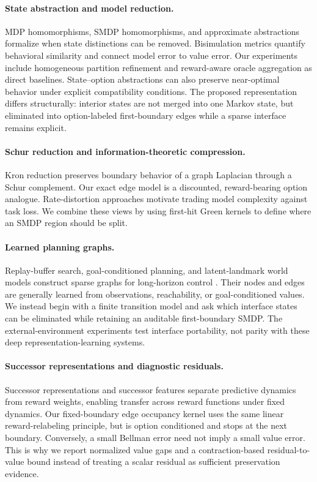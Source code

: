 \documentclass[10pt]{article}
\begin{document}
\paragraph{State abstraction and model reduction.}
MDP homomorphisms, SMDP homomorphisms, and approximate abstractions formalize
when state distinctions can be removed\citep{ravindran2003smdp,li2006abstraction}.
Bisimulation metrics quantify behavioral similarity and connect model error to
value error\citep{ferns2011bisimulation}. Our experiments include homogeneous
partition refinement and reward-aware oracle aggregation as direct baselines.
State--option abstractions can also preserve near-optimal behavior under explicit
compatibility conditions\citep{abel2020valuepreserving}.
The proposed representation differs structurally: interior states are not
merged into one Markov state, but eliminated into option-labeled first-boundary
edges while a sparse interface remains explicit.

\paragraph{Schur reduction and information-theoretic compression.}
Kron reduction preserves boundary behavior of a graph Laplacian through a Schur
complement\citep{dorfler2013kron}. Our exact edge model is a discounted,
reward-bearing option analogue. Rate-distortion approaches motivate trading
model complexity against task loss\citep{arumugam2021rate,abel2019compression}.
We combine these views by using first-hit Green kernels to define where an
SMDP region should be split.

\paragraph{Learned planning graphs.}
Replay-buffer search, goal-conditioned planning, and latent-landmark world
models construct sparse graphs for long-horizon control
\citep{eysenbach2019sorb,nasiriany2019goalconditioned,zhang2021worldgraph}.
Their nodes and edges are generally learned from observations, reachability, or
goal-conditioned values. We instead begin with a finite transition model and
ask which interface states can be eliminated while retaining an auditable
first-boundary SMDP. The external-environment experiments test interface
portability, not parity with these deep representation-learning systems.

\paragraph{Successor representations and diagnostic residuals.}
Successor representations and successor features separate predictive dynamics
from reward weights, enabling transfer across reward functions under fixed
dynamics\citep{dayan1993successor,barreto2017successor}. Our fixed-boundary edge
occupancy kernel uses the same linear reward-relabeling principle, but is option
conditioned and stops at the next boundary. Conversely, a small Bellman error
need not imply a small value error\citep{fujimoto2022bellman}. This is why we
report normalized value gaps and a contraction-based residual-to-value bound
instead of treating a scalar residual as sufficient preservation evidence.
\end{document}
